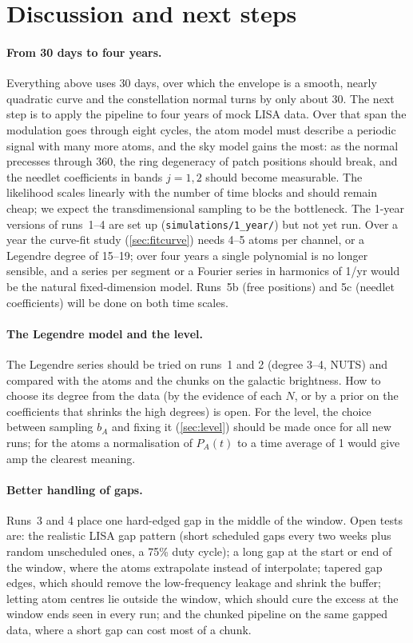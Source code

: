 \documentclass[11pt,a4paper]{article}
\begin{document}
\section{Discussion and next steps}

\paragraph{From 30 days to four years.} Everything above uses 30 days, over which the
envelope is a smooth, nearly quadratic curve and the constellation normal turns by
only about 30\textdegree. The next step is to apply the pipeline to four years of mock
LISA data. Over that span the modulation goes through eight cycles, the atom model
must describe a periodic signal with many more atoms, and the sky model gains the most:
as the normal precesses through 360\textdegree, the ring degeneracy of patch positions
should break, and the needlet coefficients in bands $j=1,2$ should become measurable.
The likelihood scales linearly with the number of time blocks and should remain
cheap; we expect the transdimensional sampling to be the bottleneck. The 1-year
versions of runs~1--4 are set up (\texttt{simulations/1\_year/}) but not yet run.
Over a year the curve-fit study (\cref{sec:fitcurve}) needs 4--5 atoms per channel,
or a Legendre degree of 15--19; over four years a single polynomial is no longer
sensible, and a series per segment or a Fourier series in harmonics of 1/yr would be
the natural fixed-dimension model. Runs~5b (free positions) and 5c
(needlet coefficients) will be done on both time scales.

\paragraph{The Legendre model and the level.} The Legendre series should be tried
on runs~1 and 2 (degree 3--4, NUTS) and compared with the atoms and the chunks on the
galactic brightness. How to choose its degree from the data (by the evidence of each
$N$, or by a prior on the coefficients that shrinks the high degrees) is open. For the
level, the choice between sampling $b_A$ and fixing it (\cref{sec:level}) should be
made once for all new runs; for the atoms a normalisation of $P_A(t)$ to a time
average of 1 would give amp the clearest meaning.

\paragraph{Better handling of gaps.} Runs~3 and 4 place one hard-edged gap in the
middle of the window. Open tests are: the realistic LISA gap pattern (short scheduled
gaps every two weeks plus random unscheduled ones, a 75\% duty cycle); a long gap at
the start or end of the window, where the atoms extrapolate instead of interpolate;
tapered gap edges, which should remove the low-frequency leakage and shrink the
buffer; letting atom centres lie outside the window, which should cure the excess at
the window ends seen in every run; and the chunked pipeline on the same gapped data,
where a short gap can cost most of a chunk.
\end{document}
